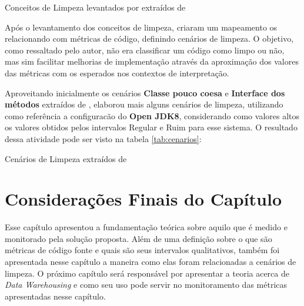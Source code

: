  \begin{table}[!ht]
\centering

\caption{Conceitos de Limpeza levantados por  extraídos de }
\label{tab:conceitos}
\end{table}
\FloatBarrier

Após o levantamento dos conceitos de limpeza,  criaram um mapeamento os relacionando com métricas de código, definindo cenários de limpeza. O objetivo, como ressaltado pelo autor, não era classificar um código como limpo ou não, mas sim facilitar melhorias de implementação através da aproximação dos valores das métricas com os esperados nos contextos de interpretação.

Aproveitando inicialmente os cenários \textbf{Classe pouco coesa} e \textbf{Interface dos métodos} extraídos de  ,  elaborou mais alguns cenários de limpeza, utilizando como referência a configuracão do \textbf{Open JDK8}, considerando como valores altos os valores obtidos pelos intervalos  Regular e Ruim para esse sistema. O resultado dessa atividade pode ser visto na tabela \ref{tab:cenarios}:

\begin{table}
\begin{table}[H]
\centering

\caption{Cenários de Limpeza extraídos de }
\label{tab:cenarios}
\end{table}
\FloatBarrier
\end{table}  

\section{Considerações Finais do Capítulo}  

Esse capítulo apresentou a fundamentação teórica sobre aquilo que é medido e monitorado pela solução proposta. Além de uma definição sobre o que são métricas de código fonte e quais são seus intervalos qualitativos, também foi apresentada nesse capítulo a maneira como elas foram relacionadas a cenários de limpeza. O próximo capítulo será responsável por apresentar a teoria acerca de \textit{Data Warehousing} e como seu uso pode servir no monitoramento das métricas apresentadas nesse capítulo.